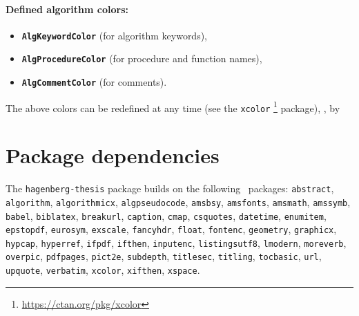 \documentclass[english]{hgbarticle}
\begin{document}
\paragraph{Defined algorithm colors:}
\begin{itemize}
\item[] \textbf{\texttt{AlgKeywordColor}} (for algorithm keywords),
\item[] \textbf{\texttt{AlgProcedureColor}} (for procedure and function names),
\item[] \textbf{\texttt{AlgCommentColor}} (for comments).
\end{itemize}
The above colors can be redefined at any time (see the \texttt{xcolor}%
\footnote{\url{https://ctan.org/pkg/xcolor}} package), \eg, by
\begin{LaTeXCode}[numbers=none]
\end{LaTeXCode}


\section{Package dependencies}

\begin{sloppypar}
The \texttt{hagenberg-thesis} package builds on the following \latex\ packages:\newline
\texttt{abstract}, 
\texttt{algorithm}, 
\texttt{algorithmicx}, 
\texttt{algpseudocode}, 
\texttt{amsbsy}, 
\texttt{amsfonts}, 
\texttt{amsmath}, 
\texttt{amssymb}, 
\texttt{babel}, 
\texttt{biblatex}, 
\texttt{breakurl}, 
\texttt{caption}, 
\texttt{cmap}, 
\texttt{csquotes}, 
\texttt{datetime}, 
\texttt{enumitem}, 
\texttt{epstopdf}, 
\texttt{eurosym}, 
\texttt{exscale}, 
\texttt{fancyhdr}, 
\texttt{float}, 
\texttt{fontenc}, 
\texttt{geometry}, 
\texttt{graphicx}, 
\texttt{hypcap}, 
\texttt{hyperref}, 
\texttt{ifpdf}, 
\texttt{ifthen}, 
\texttt{inputenc}, 
\texttt{listingsutf8}, 
\texttt{lmodern}, 
\texttt{moreverb}, 
\texttt{overpic}, 
\texttt{pdfpages}, 
\texttt{pict2e}, 
\texttt{subdepth}, 
\texttt{titlesec}, 
\texttt{titling},
\texttt{tocbasic},
\texttt{url}, 
\texttt{upquote}, 
\texttt{verbatim}, 
\texttt{xcolor}, 
\texttt{xifthen}, 
\texttt{xspace}.
\end{sloppypar}
\end{document}
